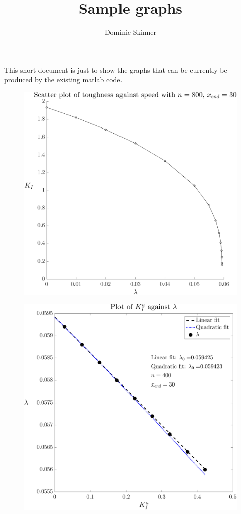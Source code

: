 \documentclass{article}
\begin{document}
\title{Sample graphs}
\author{Dominic Skinner}
\maketitle
This short document is just to show the graphs that can be
currently be produced by the existing matlab code. 
\begin{figure}[ht]\centering
\includegraphics[scale=0.3]{K-lambda.pdf}
\end{figure}
\begin{figure}[ht]\centering
\includegraphics[scale=0.3]{l0.pdf}
\end{figure}
\end{document}

